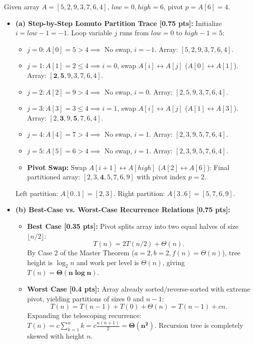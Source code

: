 \documentclass[11pt,a4paper]{article}
\begin{document}
\begin{solutionbox}
Given array $A = [5, 2, 9, 3, 7, 6, 4]$, $low = 0, high = 6$, pivot $p = A[6] = 4$.
\begin{itemize}
    \item \textbf{(a) Step-by-Step Lomuto Partition Trace [0.75 pts]:}
    Initialize $i = low - 1 = -1$. Loop variable $j$ runs from $low = 0$ to $high - 1 = 5$:
    \begin{itemize}
        \item $j = 0: A[0] = 5 > 4 \implies$ No swap, $i = -1$. Array: $[5, 2, 9, 3, 7, 6, 4]$.
        \item $j = 1: A[1] = 2 \le 4 \implies i = 0$, swap $A[i] \leftrightarrow A[j]$ ($A[0] \leftrightarrow A[1]$). Array: $[\mathbf{2}, \mathbf{5}, 9, 3, 7, 6, 4]$.
        \item $j = 2: A[2] = 9 > 4 \implies$ No swap, $i = 0$. Array: $[2, 5, 9, 3, 7, 6, 4]$.
        \item $j = 3: A[3] = 3 \le 4 \implies i = 1$, swap $A[i] \leftrightarrow A[j]$ ($A[1] \leftrightarrow A[3]$). Array: $[2, \mathbf{3}, 9, \mathbf{5}, 7, 6, 4]$.
        \item $j = 4: A[4] = 7 > 4 \implies$ No swap, $i = 1$. Array: $[2, 3, 9, 5, 7, 6, 4]$.
        \item $j = 5: A[5] = 6 > 4 \implies$ No swap, $i = 1$. Array: $[2, 3, 9, 5, 7, 6, 4]$.
        \item \textbf{Pivot Swap:} Swap $A[i+1] \leftrightarrow A[high]$ ($A[2] \leftrightarrow A[6]$):
        Final partitioned array: $[2, 3, \mathbf{4}, 5, 7, 6, 9]$ with pivot index $p = 2$.
    \end{itemize}
    Left partition: $A[0..1] = [2, 3]$. Right partition: $A[3..6] = [5, 7, 6, 9]$.
    \item \textbf{(b) Best-Case vs. Worst-Case Recurrence Relations [0.75 pts]:}
    \begin{itemize}
        \item \textbf{Best Case [0.35 pts]:} Pivot splits array into two equal halves of size $\lfloor n/2 \rfloor$:
        \[
        T(n) = 2T(n/2) + \Theta(n).
        \]
        By Case 2 of the Master Theorem ($a = 2, b = 2, f(n) = \Theta(n)$), tree height is $\log_2 n$ and work per level is $\Theta(n)$, giving $T(n) = \mathbf{\Theta(n \log n)}$.
        \item \textbf{Worst Case [0.4 pts]:} Array already sorted/reverse-sorted with extreme pivot, yielding partitions of sizes $0$ and $n-1$:
        \[
        T(n) = T(n-1) + T(0) + \Theta(n) = T(n-1) + cn.
        \]
        Expanding the telescoping recurrence: $T(n) = c \sum_{k=1}^n k = c \frac{n(n+1)}{2} = \mathbf{\Theta(n^2)}$. Recursion tree is completely skewed with height $n$.
    \end{itemize}
\end{itemize}
\end{solutionbox}
\end{document}
